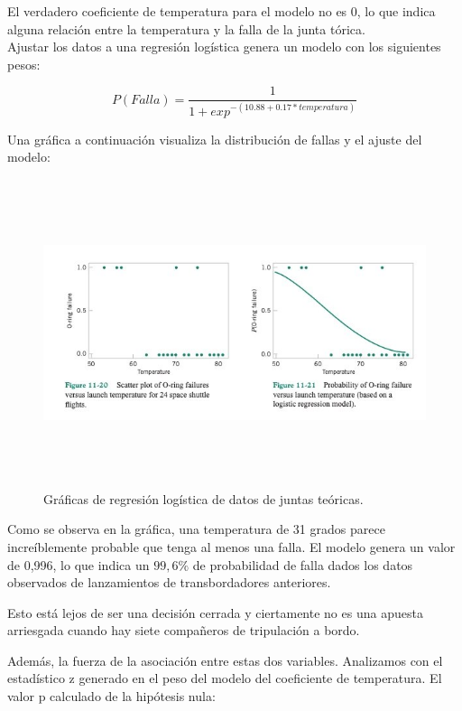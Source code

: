El verdadero coeficiente de temperatura para el modelo no es 0, lo que indica
alguna relaci\'on entre la temperatura y la falla de la junta t\'orica.\\

Ajustar los datos a una regresi\'on log\'istica genera un modelo con los
siguientes pesos:

\begin{equation} 
P(Falla)= \frac{1}{1+exp^{-(10.88+0.17*temperatura)}}
\end{equation} 

Una gr\'afica a continuaci\'on visualiza la distribuci\'on de fallas y el ajuste
del modelo:

\begin{center} 
    \begin{figure}[h]
    \includegraphics[width=12cm, height=9cm]{figures/challenger_plots.jpg}
    \caption{Gr\'aficas de regresi\'on log\'istica de datos de juntas te\'oricas.}
    \end{figure}
\end{center} 

Como se observa en la gr\'afica, una temperatura de 31 grados parece
incre\'iblemente probable que tenga al menos una falla. El modelo genera un
valor de 0,996, lo que indica un $99,6 \%$ de probabilidad de falla dados los
datos observados de lanzamientos de transbordadores anteriores.

Esto est\'a lejos de ser una decisi\'on cerrada y ciertamente no es una apuesta
arriesgada cuando hay siete compañeros de tripulaci\'on a bordo.

Adem\'as, la fuerza de la asociaci\'on entre estas dos variables. Analizamos con
el estad\'istico z generado en el peso del modelo del coeficiente de
temperatura. El valor p calculado de la hip\'otesis nula:



